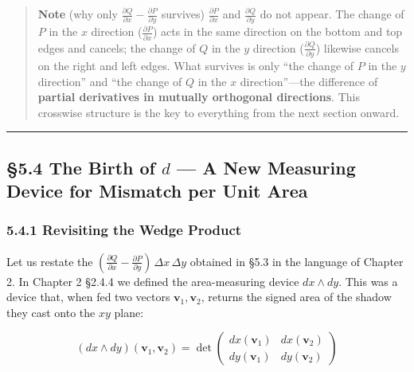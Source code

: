 \begin{quote}
\textbf{Note} (why only
\(\frac{\partial Q}{\partial x}-\frac{\partial P}{\partial y}\)
survives) \(\frac{\partial P}{\partial x}\) and
\(\frac{\partial Q}{\partial y}\) do not appear. The change of \(P\) in
the \(x\) direction (\(\frac{\partial P}{\partial x}\)) acts in the same
direction on the bottom and top edges and cancels; the change of \(Q\)
in the \(y\) direction (\(\frac{\partial Q}{\partial y}\)) likewise
cancels on the right and left edges. What survives is only ``the change
of \(P\) in the \(y\) direction'' and ``the change of \(Q\) in the \(x\)
direction''---the difference of
\textbf{partial derivatives in mutually orthogonal directions}. This
crosswise structure is the key to everything from the next section
onward.
\end{quote}

\begin{center}\rule{0.5\linewidth}{0.5pt}\end{center}

\hypertarget{the-birth-of-d-a-new-measuring-device-for-mismatch-per-unit-area}{%
\subsection{\texorpdfstring{§5.4 The Birth of \(d\) --- A New Measuring
Device for Mismatch per Unit
Area}{§5.4 The Birth of d --- A New Measuring Device for Mismatch per Unit Area}}\label{the-birth-of-d-a-new-measuring-device-for-mismatch-per-unit-area}}

\hypertarget{revisiting-the-wedge-product}{%
\subsubsection{5.4.1 Revisiting the Wedge
Product}\label{revisiting-the-wedge-product}}

Let us restate the
\((\frac{\partial Q}{\partial x} - \frac{\partial P}{\partial y})\,\Delta x\,\Delta y\)
obtained in §5.3 in the language of Chapter 2. In Chapter 2 §2.4.4 we
defined the area-measuring device \(dx \wedge dy\). This was a device
that, when fed two vectors \(\mathbf{v}_1, \mathbf{v}_2\), returns the
signed area of the shadow they cast onto the \(xy\) plane:

\[(dx \wedge dy)(\mathbf{v}_1, \mathbf{v}_2) = \det\begin{pmatrix} dx(\mathbf{v}_1) & dx(\mathbf{v}_2) \\ dy(\mathbf{v}_1) & dy(\mathbf{v}_2) \end{pmatrix}\]

